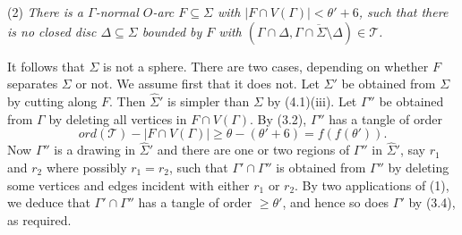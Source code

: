 \hspace*{12pt}(2) \textit{There is a $\Gamma$-normal $O$-arc $F \subseteq \Sigma$ with $|F \cap V(\Gamma)| < \theta' + 6$, such that there is no closed disc $\Delta \subseteq \Sigma$ bounded by $F$ with $(\Gamma \cap \Delta, \overline{\Gamma \cap \Sigma \setminus \Delta}) \in \mathcal{T}$.}

It follows that $\Sigma$ is not a sphere. There are two cases, depending on whether $F$ separates $\Sigma$ or not. We assume first that it does not. Let $\Sigma'$ be obtained from $\Sigma$ by cutting along $F$. Then $\hat{\Sigma}'$ is simpler than $\Sigma$ by (4.1)(iii). Let $\Gamma''$ be obtained from $\Gamma$ by deleting all vertices in $F \cap V(\Gamma)$. By (3.2), $\Gamma''$ has a tangle of order
\begin{equation*}
ord(\mathcal{T}) - |F \cap V(\Gamma)| \ge \theta - (\theta' + 6) = f(f(\theta')).
\end{equation*}
Now $\Gamma''$ is a drawing in $\hat{\Sigma}'$ and there are one or two regions of $\Gamma''$ in $\hat{\Sigma}'$, say $r_1$ and $r_2$ where possibly $r_1 = r_2$, such that $\Gamma' \cap \Gamma''$ is obtained from $\Gamma''$ by deleting some vertices and edges incident with either $r_1$ or $r_2$. By two applications of (1), we deduce that $\Gamma' \cap \Gamma''$ has a tangle of order $\ge \theta'$, and hence so does $\Gamma'$ by (3.4), as required.
